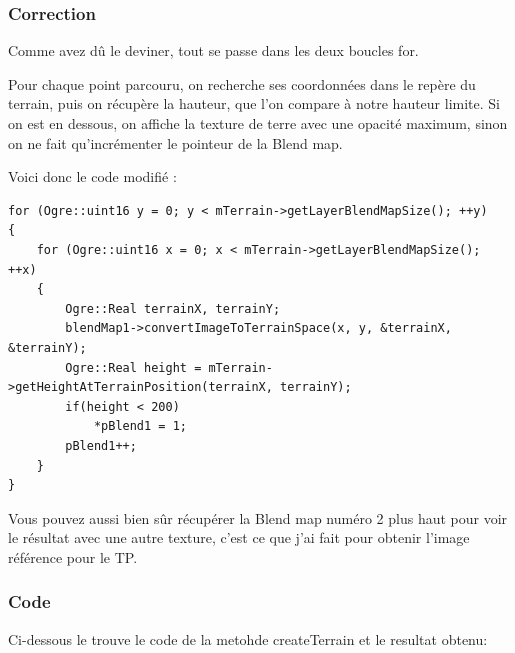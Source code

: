 \subsubsection{Correction}

Comme avez d\^u le deviner, tout se passe dans les deux boucles for.

Pour chaque point parcouru, on recherche ses coordonnées dans le repère du terrain, puis on récupère la hauteur, que l'on compare à notre hauteur limite. Si on est en dessous, on affiche la texture de terre avec une opacité maximum, sinon on ne fait qu'incrémenter le pointeur de la Blend map.

Voici donc le code modifié :

\begin{lstlisting}[caption={Attribution de la transparence désirée sur tous les points du calque selon leur position}]
for (Ogre::uint16 y = 0; y < mTerrain->getLayerBlendMapSize(); ++y)
{
    for (Ogre::uint16 x = 0; x < mTerrain->getLayerBlendMapSize(); ++x)
    {
        Ogre::Real terrainX, terrainY;
        blendMap1->convertImageToTerrainSpace(x, y, &terrainX, &terrainY);
        Ogre::Real height = mTerrain->getHeightAtTerrainPosition(terrainX, terrainY);
        if(height < 200)
            *pBlend1 = 1;
        pBlend1++;
    }
}
\end{lstlisting}

Vous pouvez aussi bien s\^ur récupérer la Blend map numéro 2 plus haut pour voir le résultat avec une autre texture, c'est ce que j'ai fait pour obtenir l'image référence pour le TP.








\subsubsection{Code}

Ci-dessous le trouve le code de la metohde createTerrain et le resultat obtenu:

